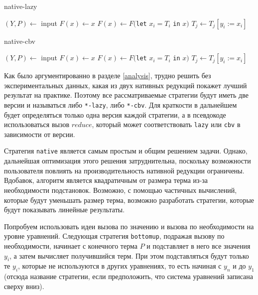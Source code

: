 \documentclass[../thesis.tex]{subfiles}
\begin{document}
\begin{megaalgorithm}
    \caption{native-lazy}
  \begin{algorithmic}
    \State $(Y, P)\gets$ input
    \State $F(x) \gets x$
        \State $F(x) \gets F($\texttt{let} $x_i = T_i$ \texttt{in} $x)$
            \State $T_j \gets T_j[y_i := x_i]$
        \EndFor
    \EndFor
    \State {}
  \end{algorithmic}
\end{megaalgorithm}  

\begin{megaalgorithm}
    \caption{native-cbv}
  \begin{algorithmic}
    \State $(Y, P)\gets$ input
    \State $F(x) \gets x$
        \State $F(x) \gets F($\texttt{let} $x_i = T_i$ \texttt{in} $x)$
            \State $T_j \gets T_j[y_i := x_i]$
        \EndFor
    \EndFor
    \State \Return {\textcolor{red}{$cbv(F(P))$}}
  \end{algorithmic}
\end{megaalgorithm}

Как было аргументированно в разделе \ref{analysis}, трудно решить без экспериментальных данных, какая из двух нативных редукций покажет лучший результат на практике. Поэтому все рассматриваемые стратегии будут иметь две версии и называться либо \texttt{*-lazy}, либо \texttt{*-cbv}. Для краткости в дальнейшем будет определяться только одна версия каждой стратегии, а в псевдокоде использоваться вызов $reduce$, который может соответствовать \texttt{lazy} или  \texttt{cbv} в зависимости от версии.

Стратегия \texttt{native} является самым простым и общим решением задачи. Однако, дальнейшая оптимизация этого решения затруднительна, поскольку возможности пользователя повлиять на производительность нативной редукции ограничены. Вдобавок, алгоритм является квадратичным от размера терма из-за необходимости подстановок. Возможно, с помощью частичных вычислений, которые будут уменьшать размер терма, возможно разработать стратегии, которые будут показывать линейные результаты.

Попробуем использовать идеи вызова по значению и вызова по необходимости на уровне уравнений. Следующая стратегия \texttt{bottomup}, подражая вызову по необходимости, начинает с конечного терма $P$ и подставляет в него все значения $y_i$, а затем вычисляет получившийся терм. При этом подставляться будут только те $y_i$, которые не используются в других уравнениях, то есть начиная с $y_n$ и до $y_1$ (отсюда название стратегии, если предположить, что система уравнений записана сверху вниз). 
\end{document}
